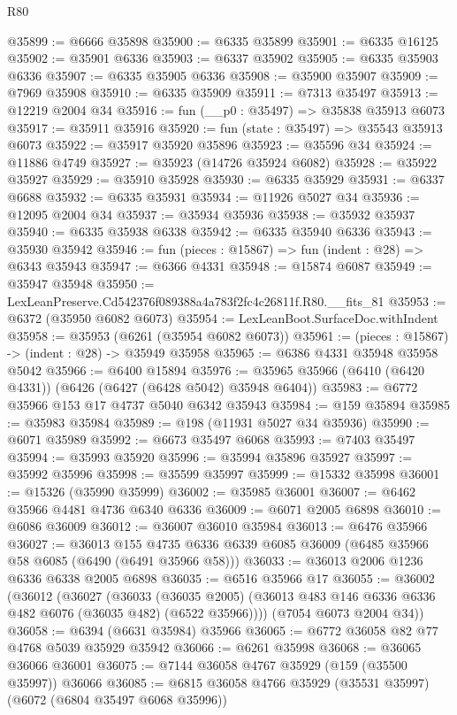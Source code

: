 \begin{lexlean}{R80}
\begin{coremodule}
@35899 := @6666 @35898
@35900 := @6335 @35899
@35901 := @6335 @16125
@35902 := @35901 @6336
@35903 := @6337 @35902
@35905 := @6335 @35903 @6336
@35907 := @6335 @35905 @6336
@35908 := @35900 @35907
@35909 := @7969 @35908
@35910 := @6335 @35909
@35911 := @7313 @35497
@35913 := @12219 @2004 @34
@35916 := fun (__p0 : @35497) => @35838 @35913 @6073
@35917 := @35911 @35916
@35920 := fun (state : @35497) => @35543 @35913 @6073
@35922 := @35917 @35920 @35896
@35923 := @35596 @34
@35924 := @11886 @4749
@35927 := @35923 (@14726 @35924 @6082)
@35928 := @35922 @35927
@35929 := @35910 @35928
@35930 := @6335 @35929
@35931 := @6337 @6688
@35932 := @6335 @35931
@35934 := @11926 @5027 @34
@35936 := @12095 @2004 @34
@35937 := @35934 @35936
@35938 := @35932 @35937
@35940 := @6335 @35938 @6338
@35942 := @6335 @35940 @6336
@35943 := @35930 @35942
@35946 := fun (pieces : @15867) => fun (indent : @28) => @6343 @35943
@35947 := @6366 @4331
@35948 := @15874 @6087
@35949 := @35947 @35948
@35950 := LexLeanPreserve.Cd542376f089388a4a783f2fc4c26811f.R80.__fits_81
@35953 := @6372 (@35950 @6082 @6073)
@35954 := LexLeanBoot.SurfaceDoc.withIndent
@35958 := @35953 (@6261 (@35954 @6082 @6073))
@35961 := (pieces : @15867) -> (indent : @28) -> @35949 @35958
@35965 := @6386 @4331 @35948 @35958 @5042
@35966 := @6400 @15894
@35976 := @35965 @35966 (@6410 (@6420 @4331)) (@6426 (@6427 (@6428 @5042) @35948 @6404))
@35983 := @6772 @35966 @153 @17 @4737 @5040 @6342 @35943
@35984 := @159 @35894
@35985 := @35983 @35984
@35989 := @198 (@11931 @5027 @34 @35936)
@35990 := @6071 @35989
@35992 := @6673 @35497 @6068
@35993 := @7403 @35497
@35994 := @35993 @35920
@35996 := @35994 @35896 @35927
@35997 := @35992 @35996
@35998 := @35599 @35997
@35999 := @15332 @35998
@36001 := @15326 (@35990 @35999)
@36002 := @35985 @36001
@36007 := @6462 @35966 @4481 @4736 @6340 @6336
@36009 := @6071 @2005 @6898
@36010 := @6086 @36009
@36012 := @36007 @36010 @35984
@36013 := @6476 @35966
@36027 := @36013
    @155
    @4735
    @6336
    @6339
    @6085
    @36009
    (@6485 @35966 @58 @6085 (@6490 (@6491 @35966 @58)))
@36033 := @36013 @2006 @1236 @6336 @6338 @2005 @6898
@36035 := @6516 @35966 @17
@36055 := @36002
    (@36012
      (@36027
        (@36033
          (@36035 @2005)
          (@36013 @483 @146 @6336 @6336 @482 @6076 (@36035 @482) (@6522 @35966))))
      (@7054 @6073 @2004 @34))
@36058 := @6394 (@6631 @35984) @35966
@36065 := @6772 @36058 @82 @77 @4768 @5039 @35929 @35942
@36066 := @6261 @35998
@36068 := @36065 @36066 @36001
@36075 := @7144 @36058 @4767 @35929 (@159 (@35500 @35997)) @36066
@36085 := @6815 @36058 @4766 @35929 (@35531 @35997) (@6072 (@6804 @35497 @6068 @35996))

\end{coremodule}
\end{lexlean}
